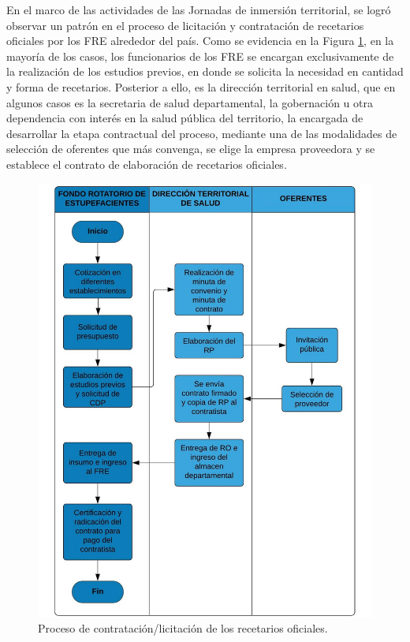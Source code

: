 \documentclass[
]{book}
\begin{document}
En el marco de las actividades de las Jornadas de inmersión territorial, se logró observar un patrón en el proceso de licitación y contratación de recetarios oficiales por los FRE alrededor del país. Como se evidencia en la Figura \ref{fig:procesoContractual}, en la mayoría de los casos, los funcionarios de los FRE se encargan exclusivamente de la realización de los estudios previos, en donde se solicita la necesidad en cantidad y forma de recetarios. Posterior a ello, es la dirección territorial en salud, que en algunos casos es la secretaria de salud departamental, la gobernación u otra dependencia con interés en la salud pública del territorio, la encargada de desarrollar la etapa contractual del proceso, mediante una de las modalidades de selección de oferentes que más convenga, se elige la empresa proveedora y se establece el contrato de elaboración de recetarios oficiales.

\begin{figure}

{\centering \includegraphics[width=0.8\linewidth]{figures/procesoContractual} 

}

\caption{Proceso de contratación/licitación de los recetarios oficiales.}\label{fig:procesoContractual}
\end{figure}
\end{document}
